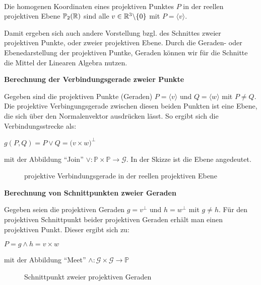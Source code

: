   \begin{defi} \ \\
    Die homogenen Koordinaten eines projektiven Punktes $P$ in der reellen projektiven Ebene $\mathbb{P}_2(\mathbb R)$ sind alle 
    $v\in \mathbb R^3\backslash\{0\}$ mit $P=\langle v \rangle$.
  \end{defi}

  Damit ergeben sich auch andere Vorstellung bzgl. des Schnittes zweier projektiven Punkte, oder zweier projektiven Ebene. 
  Durch die Geraden- oder Ebenedarstellung der projektiven Puntke, Geraden können wir für die Schnitte die Mittel der Linearen 
  Algebra nutzen. \par \medskip
  
  \textbf{Berechnung der Verbindungsgerade zweier Punkte} \par
  Gegeben sind die projektiven Punkte (Geraden) $P=\langle v \rangle$ und $Q=\langle w \rangle$ 
  mit $P\neq Q$. Die projektive Verbingungsgerade zwischen diesen beiden Punkten ist eine Ebene, 
  die sich über den Normalenvektor ausdrücken lässt. So ergibt sich die Verbindungsstrecke als: 
  \par
  \begin{center}
    $g(P,Q) = P \vee Q = \big( v \times w \big)^\perp$
  \end{center} \par
  mit der Abbildung "`Join"' $\vee: \mathbb{P} \times \mathbb{P} \rightarrow \mathcal{G}$. In 
  der Skizze ist die Ebene angedeutet.
  \begin{figure}[h]
    
    \caption{projektive Verbindungsgerade in der reellen projektiven Ebene}
  \end{figure}

  \textbf{Berechnung von Schnittpunkten zweier Geraden} \par
  Gegeben seien die projektiven Geraden $g=v^\perp$ und $h=w^\perp$ mit $g\neq h$. Für den 
  projektiven Schnittpunkt beider projektiven Geraden erhält man einen projektiven Punkt. 
  Dieser ergibt sich zu:
  \begin{center}
    $P = g \wedge h = v \times w $
  \end{center}
  mit der Abbildung "`Meet"' $\wedge: \mathcal{G} \times \mathcal{G} \rightarrow \mathbb{P}$ 
  \begin{figure}[h]
    
    \caption{Schnittpunkt zweier projektiven Geraden}
  \end{figure}


